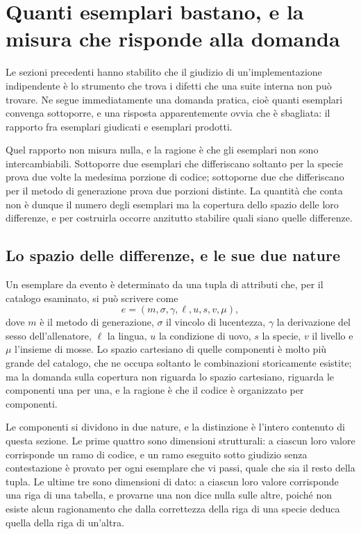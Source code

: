 \section{Quanti esemplari bastano, e la misura che risponde alla domanda}

Le sezioni precedenti hanno stabilito che il giudizio di un'implementazione indipendente è lo strumento che trova i difetti che una suite interna non può trovare. Ne segue immediatamente una domanda pratica, cioè quanti esemplari convenga sottoporre, e una risposta apparentemente ovvia che è sbagliata: il rapporto fra esemplari giudicati e esemplari prodotti.

Quel rapporto non misura nulla, e la ragione è che gli esemplari non sono intercambiabili. Sottoporre due esemplari che differiscano soltanto per la specie prova due volte la medesima porzione di codice; sottoporne due che differiscano per il metodo di generazione prova due porzioni distinte. La quantità che conta non è dunque il numero degli esemplari ma la copertura dello spazio delle loro differenze, e per costruirla occorre anzitutto stabilire quali siano quelle differenze.

\subsection*{Lo spazio delle differenze, e le sue due nature}

Un esemplare da evento è determinato da una tupla di attributi che, per il catalogo esaminato, si può scrivere come
\begin{equation}
e = (m, \sigma, \gamma, \ell, u, s, v, \mu),
\end{equation}
dove $m$ è il metodo di generazione, $\sigma$ il vincolo di lucentezza, $\gamma$ la derivazione del sesso dell'allenatore, $\ell$ la lingua, $u$ la condizione di uovo, $s$ la specie, $v$ il livello e $\mu$ l'insieme di mosse. Lo spazio cartesiano di quelle componenti è molto più grande del catalogo, che ne occupa soltanto le combinazioni storicamente esistite; ma la domanda sulla copertura non riguarda lo spazio cartesiano, riguarda le componenti una per una, e la ragione è che il codice è organizzato per componenti.

Le componenti si dividono in due nature, e la distinzione è l'intero contenuto di questa sezione. Le prime quattro sono dimensioni strutturali: a ciascun loro valore corrisponde un ramo di codice, e un ramo eseguito sotto giudizio senza contestazione è provato per ogni esemplare che vi passi, quale che sia il resto della tupla. Le ultime tre sono dimensioni di dato: a ciascun loro valore corrisponde una riga di una tabella, e provarne una non dice nulla sulle altre, poiché non esiste alcun ragionamento che dalla correttezza della riga di una specie deduca quella della riga di un'altra.

